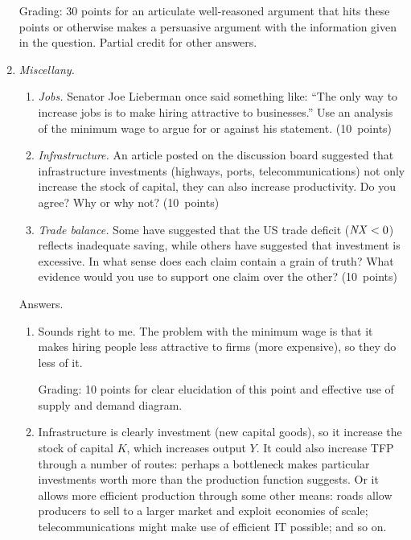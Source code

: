 \documentclass[letterpaper,12pt]{article}
\newcommand{\NX}{\mbox{\em NX\/}}
\begin{document}
\begin{enumerate}
\begin{itemize}
\end{itemize}

Grading:  30 points for an articulate 
well-reasoned argument that hits these points
or otherwise makes a persuasive argument with the information
given in the question. Partial credit for other answers. 



\item {\it Miscellany.\/}
\begin{enumerate}

\item {\it Jobs.\/}
Senator Joe Lieberman once said something like:
``The only way to increase jobs is to make hiring attractive
to businesses.''
Use an analysis of the minimum wage to argue for or against 
his statement.  
(10~points) 

\item {\it Infrastructure.\/}
An article posted on the discussion board suggested that infrastructure investments (highways, ports, telecommunications) 
not only increase the stock of capital, 
they  can also increase productivity.  
Do you agree?  Why or why not?   
(10~points)

\item {\it Trade balance.\/} 
Some have suggested that the US trade deficit 
($\NX < 0$) reflects inadequate saving, 
while others have suggested that investment is excessive.  
In what sense does each claim contain a grain of truth?  
What evidence would you use  to support one claim over
the other?  
(10~points)
\end{enumerate}

Answers.  
\begin{enumerate}

\item Sounds right to me.  The problem with the minimum wage
is that it makes hiring people less attractive to firms 
(more expensive), 
so they do less of it.  

Grading:  10 points for clear elucidation of this point 
and effective use of supply and demand diagram.  

\item Infrastructure is clearly investment 
(new capital goods), so it increase the stock of capital $K$, 
which increases output $Y$.  
It could also increase TFP through a number of routes:
perhaps a bottleneck makes particular investments worth 
more than the production function suggests. 
Or it allows more efficient production through some other means:
roads allow producers to sell to a larger market and exploit
economies of scale;
telecommunications might make use of efficient IT possible; 
and so on.  


\end{enumerate}
\end{enumerate}
\end{document}
